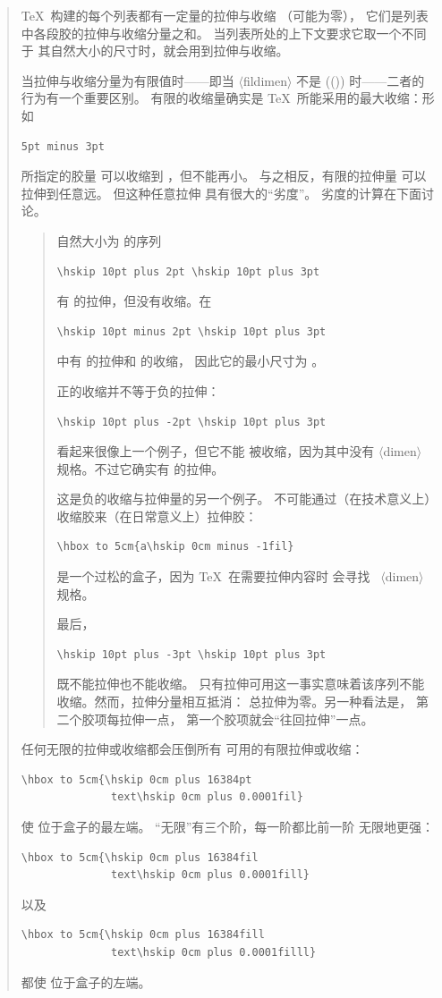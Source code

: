 \documentclass[a4paper]{rapport3}
\def\gr#1{$\langle$#1$\rangle$}\def\key#1{{\tt#1}}
\newenvironment{disp}{\begin{quotation}}{\end{quotation}}
\newenvironment{example}{\begin{quotation}}{\end{quotation}}
\begin{document}
\begin{disp}
\TeX\ 构建的每个列表都有一定量的拉伸与收缩
（可能为零），
它们是列表中各段胶的拉伸与收缩分量之和。
当列表所处的上下文要求它取一个不同于
其自然大小的尺寸时，就会用到拉伸与收缩。

当拉伸与收缩分量为有限值时——即当
\gr{fildimen} 不是 (()) 时——二者的行为有一个重要区别。
有限的收缩量确实是 \TeX\ 所能采用的最大收缩：形如
\begin{verbatim}
5pt minus 3pt
\end{verbatim}
所指定的胶量
可以收缩到 \n{2pt}，但不能再小。
与之相反，有限的拉伸量
可以拉伸到任意远。
但这种任意拉伸
具有很大的“劣度”。
劣度的计算在下面讨论。

\begin{example}
自然大小为 \n{20pt} 的序列
\begin{verbatim}
\hskip 10pt plus 2pt \hskip 10pt plus 3pt
\end{verbatim}
有 \n{5pt} 的拉伸，但没有收缩。在
\begin{verbatim}
\hskip 10pt minus 2pt \hskip 10pt plus 3pt
\end{verbatim}
中有 \n{3pt} 的拉伸和 \n{2pt} 的收缩，
因此它的最小尺寸为 \n{18pt}。 

正的收缩并不等于负的拉伸：
\begin{verbatim}
\hskip 10pt plus -2pt \hskip 10pt plus 3pt
\end{verbatim}
看起来很像上一个例子，但它不能
被收缩，因为其中没有 \hbox{\gr{dimen}}
规格。不过它确实有 \n{1pt} 的拉伸。

这是负的收缩与拉伸量的另一个例子。
不可能通过（在技术意义上）收缩胶来（在日常意义上）拉伸胶： \begin{verbatim}
\hbox to 5cm{a\hskip 0cm minus -1fil}
\end{verbatim}
是一个过松的盒子，因为 \TeX\ 在需要拉伸内容时
会寻找 ~\gr{dimen} 规格。

最后， \begin{verbatim}
\hskip 10pt plus -3pt \hskip 10pt plus 3pt
\end{verbatim}
既不能拉伸也不能收缩。
只有拉伸可用这一事实意味着该序列不能
收缩。然而，拉伸分量相互抵消：
总拉伸为零。另一种看法是，
第二个胶项每拉伸一点，
第一个胶项就会“往回拉伸”一点。
\end{example}

任何无限的拉伸或收缩都会压倒所有
可用的有限拉伸或收缩：
\begin{verbatim}
\hbox to 5cm{\hskip 0cm plus 16384pt 
              text\hskip 0cm plus 0.0001fil}
\end{verbatim}
使  位于盒子的最左端。
“无限”有三个阶，每一阶都比前一阶
无限地更强：
\begin{verbatim}
\hbox to 5cm{\hskip 0cm plus 16384fil
              text\hskip 0cm plus 0.0001fill}
\end{verbatim}
以及
\begin{verbatim}
\hbox to 5cm{\hskip 0cm plus 16384fill
              text\hskip 0cm plus 0.0001filll}
\end{verbatim}
都使  位于盒子的左端。




\end{disp}
\end{document}
